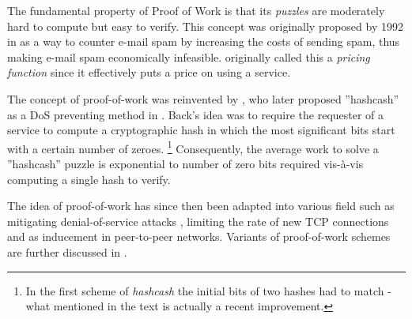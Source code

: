 

The fundamental property of Proof of Work is that its \emph{puzzles} are moderately hard to compute but easy to verify. This concept was originally proposed by \citeauthor{DworkN92} 1992 in  as a way to counter e-mail spam by increasing the costs of sending spam, thus making e-mail spam economically infeasible. \citeauthor{DworkN92} originally called this a \emph{pricing function} since it effectively puts a price on using a service.

The concept of proof-of-work was reinvented by \citeauthor{Back02}, who later proposed ''hashcash'' as a DoS preventing method in . Back's idea was to require the requester of a service to compute a cryptographic hash in which the most significant bits start with a certain number of zeroes. \footnote{In the first scheme of \emph{hashcash} the initial bits of two hashes had to match - what mentioned in the text is actually a recent improvement.} Consequently, the average work to solve a ''hashcash'' puzzle is exponential to number of zero bits required vis-à-vis computing a single hash to verify\cite{bitcoin}.

The idea of proof-of-work has since then been adapted into various field such as mitigating denial-of-service attacks \cite{mankins}, limiting the rate of new TCP connections \cite{JuelsB99} and as inducement in peer-to-peer networks\cite{bitcoin,p2p}. Variants of proof-of-work schemes are further discussed in .

\begin{comment}
\begin{GrayBox}[0.75\textwidth]
Impose each request with a cost (e.g. show proof of work to access a service )
\end{GrayBox}
\end{comment}

